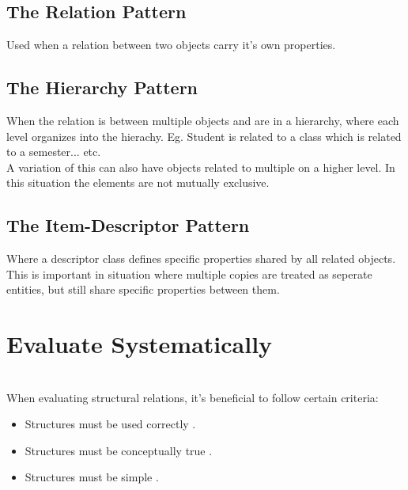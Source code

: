 \subsection*{The Relation Pattern}
Used when a relation between two objects carry it's own properties.

\subsection*{The Hierarchy Pattern}
When the relation is between multiple objects and are in a hierarchy, where each level organizes into the hierachy. Eg. Student is related to a class which is related to a semester... etc.\\
A variation of this can also have objects related to multiple on a higher level. In this situation the elements are not mutually exclusive.

\subsection*{The Item-Descriptor Pattern}
Where a descriptor class defines specific properties shared by all related objects. This is important in situation where multiple copies are treated as seperate entities, but still share specific properties between them.

\section{Evaluate Systematically \ooad[86]}
\\
When evaluating structural relations, it's beneficial to follow certain criteria:
\begin{itemize}
    \item Structures must be  used correctly \ooad[86].\\
    \item Structures must be conceptually true \ooad[87].
    \item Structures must be simple \ooad[88].
\end{itemize}